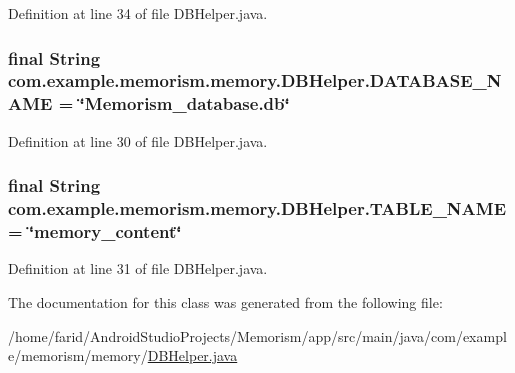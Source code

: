 Definition at line 34 of file D\+B\+Helper.\+java.

\subsubsection[{\texorpdfstring{D\+A\+T\+A\+B\+A\+S\+E\+\_\+\+N\+A\+ME}{DATABASE_NAME}}]{\setlength{\rightskip}{0pt plus 5cm}final String com.\+example.\+memorism.\+memory.\+D\+B\+Helper.\+D\+A\+T\+A\+B\+A\+S\+E\+\_\+\+N\+A\+ME = \char`\"{}Memorism\+\_\+database.\+db\char`\"{}\hspace{0.3cm}{\ttfamily [static]}}\hypertarget{classcom_1_1example_1_1memorism_1_1memory_1_1_d_b_helper_a61a19ee13881d07c502373a34687d671}{}\label{classcom_1_1example_1_1memorism_1_1memory_1_1_d_b_helper_a61a19ee13881d07c502373a34687d671}


Definition at line 30 of file D\+B\+Helper.\+java.

\subsubsection[{\texorpdfstring{T\+A\+B\+L\+E\+\_\+\+N\+A\+ME}{TABLE_NAME}}]{\setlength{\rightskip}{0pt plus 5cm}final String com.\+example.\+memorism.\+memory.\+D\+B\+Helper.\+T\+A\+B\+L\+E\+\_\+\+N\+A\+ME = \char`\"{}memory\+\_\+content\char`\"{}\hspace{0.3cm}{\ttfamily [static]}}\hypertarget{classcom_1_1example_1_1memorism_1_1memory_1_1_d_b_helper_afb514eee57c4fe21a7c1b7c9c72747a0}{}\label{classcom_1_1example_1_1memorism_1_1memory_1_1_d_b_helper_afb514eee57c4fe21a7c1b7c9c72747a0}


Definition at line 31 of file D\+B\+Helper.\+java.



The documentation for this class was generated from the following file\+:\begin{DoxyCompactItemize}
\item 
/home/farid/\+Android\+Studio\+Projects/\+Memorism/app/src/main/java/com/example/memorism/memory/\hyperlink{_d_b_helper_8java}{D\+B\+Helper.\+java}\end{DoxyCompactItemize}
